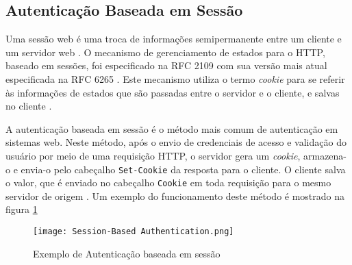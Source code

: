 \subsection{Autenticação Baseada em Sessão}

Uma sessão web é uma troca de informações semipermanente entre um cliente e um servidor web 
\cite{CALZAVARA2017}. O mecanismo de gerenciamento de estados para o HTTP, baseado em sessões, foi 
especificado na RFC 2109 \cite{RFC2109} com sua versão mais atual especificada na RFC 6265 
\cite{RFC6265}. Este mecanismo utiliza o termo \emph{cookie} para se referir às informações de 
estados que são passadas entre o servidor e o cliente, e salvas no cliente \cite{RFC2109}. 

A autenticação baseada em sessão é o método mais comum de autenticação em sistemas web. Neste 
método, após o envio de credenciais de acesso e validação do usuário por meio de uma requisição 
HTTP, o servidor gera um \emph{cookie}, armazena-o e envia-o pelo cabeçalho \texttt{Set-Cookie} da 
resposta para o cliente. O cliente salva o valor, que é enviado no cabeçalho \texttt{Cookie} em 
toda requisição para o mesmo servidor de origem \cite{PAPATHANASAKI2022}. Um exemplo do 
funcionamento deste método é mostrado na figura \ref{fig:sessionAuth}

\begin{figure}[ht]
  \centering
  \texttt{[image: Session-Based Authentication.png]}
  \caption{Exemplo de Autenticação baseada em sessão}
  \label{fig:sessionAuth}
\end{figure}